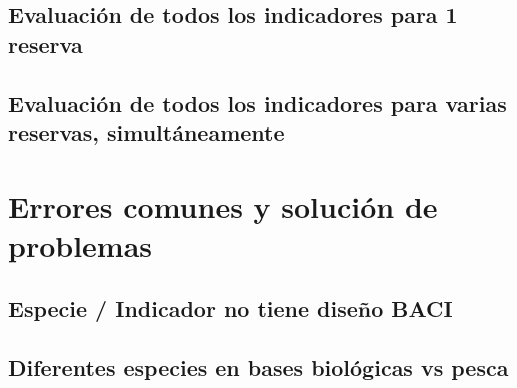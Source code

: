 \documentclass[]{book}
\begin{document}
\hypertarget{evaluacion-de-todos-los-indicadores-para-1-reserva}{%
\section{Evaluación de todos los indicadores para 1
reserva}\label{evaluacion-de-todos-los-indicadores-para-1-reserva}}

\hypertarget{evaluacion-de-todos-los-indicadores-para-varias-reservas-simultaneamente}{%
\section{Evaluación de todos los indicadores para varias reservas,
simultáneamente}\label{evaluacion-de-todos-los-indicadores-para-varias-reservas-simultaneamente}}

\hypertarget{errores-comunes-y-solucion-de-problemas}{%
\chapter{Errores comunes y solución de
problemas}\label{errores-comunes-y-solucion-de-problemas}}

\hypertarget{especie-indicador-no-tiene-diseno-baci}{%
\section{Especie / Indicador no tiene diseño
BACI}\label{especie-indicador-no-tiene-diseno-baci}}

\hypertarget{diferentes-especies-en-bases-biologicas-vs-pesca}{%
\section{Diferentes especies en bases biológicas vs
pesca}\label{diferentes-especies-en-bases-biologicas-vs-pesca}}



\backmatter
\printindex
\end{document}
